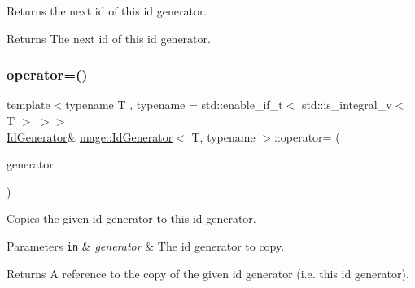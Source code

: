Returns the next id of this id generator.

\begin{DoxyReturn}{Returns}
The next id of this id generator. 
\end{DoxyReturn}
\mbox{\label{classmage_1_1_id_generator_a4dec3d729d233fac7ab00a13407c565f}} 
\subsubsection{\texorpdfstring{operator=()}{operator=()}\hspace{0.1cm}{\footnotesize\ttfamily [1/2]}}
{\footnotesize\ttfamily template$<$typename T , typename  = std\+::enable\+\_\+if\+\_\+t$<$ std\+::is\+\_\+integral\+\_\+v$<$ T $>$ $>$$>$ \\
\mbox{\hyperlink{classmage_1_1_id_generator}{Id\+Generator}}\& \mbox{\hyperlink{classmage_1_1_id_generator}{mage\+::\+Id\+Generator}}$<$ T, typename $>$\+::operator= (\begin{DoxyParamCaption}\item[{const \mbox{\hyperlink{classmage_1_1_id_generator}{Id\+Generator}}$<$ T, typename $>$ \&}]{generator }\end{DoxyParamCaption})\hspace{0.3cm}{\ttfamily [delete]}}

Copies the given id generator to this id generator.


\begin{DoxyParams}[1]{Parameters}
\mbox{\tt in}  & {\em generator} & The id generator to copy. \\
\hline
\end{DoxyParams}
\begin{DoxyReturn}{Returns}
A reference to the copy of the given id generator (i.\+e. this id generator). 
\end{DoxyReturn}
\mbox{\label{classmage_1_1_id_generator_a4b961b163059ef9a604491b5086f1b01}} 

